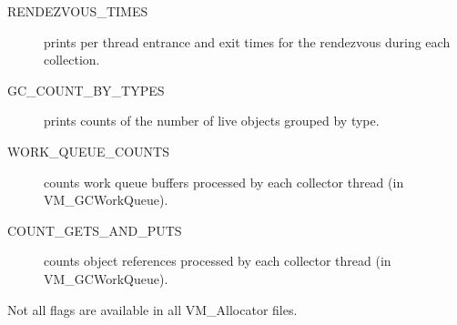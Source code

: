 \begin{description}
\item[RENDEZVOUS\_TIMES] prints per thread entrance and exit times for the
rendezvous during each collection.
\item[GC\_COUNT\_BY\_TYPES] prints counts of the number of live objects grouped
by type.
\item[WORK\_QUEUE\_COUNTS] counts work queue buffers processed by each collector
thread (in VM\_GCWorkQueue). 
\item[COUNT\_GETS\_AND\_PUTS] counts object references processed by each collector
thread (in VM\_GCWorkQueue). 
\end{description}
Not all flags are available in all VM\_Allocator files.
